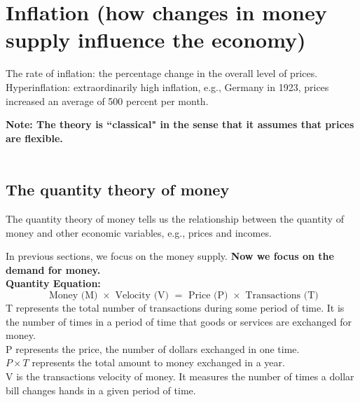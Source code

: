 \documentclass[12pt]{article}
\begin{document}
\section{Inflation (how changes in money supply influence the economy)}


The rate of inflation: the percentage change in the overall level of prices.\\
Hyperinflation: extraordinarily high inflation, e.g., Germany in 1923,
prices increased an average of 500 percent per month.

{\textbf {Note: The theory is ``classical" in the sense that it assumes that prices
are flexible.}}\\

\noindent{}\\



\subsection{The quantity theory of money}

The quantity theory of money tells us the relationship between the quantity of 
money and other economic variables, e.g., prices and incomes.

In previous sections, we focus on the money supply. {\textbf {Now we focus on
the demand for money.}}\\


{\textbf {Quantity Equation:}}
\begin{equation*}
		\text{ Money (M) } \times \text{ Velocity (V) } = \text{ Price (P) }  \times 
		\text{ Transactions (T)}
\end{equation*}
T represents the total number of transactions during some period of time. It
is the number of times in a period of time that goods or services are exchanged for 
money.\\
P represents the price, the number of dollars exchanged in one time.\\
$ P  \times T $ represents the total amount to money exchanged in a year.\\

V is the transactions velocity of money. It measures the number of times a dollar
bill changes hands in a given period of time.\\
\end{document}

